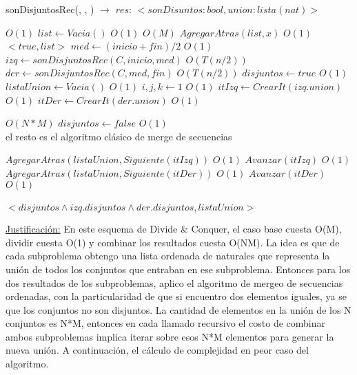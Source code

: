 \documentclass[10pt, a4paper]{article}
\begin{document}
\begin{algorithm}[H]{sonDisjuntosRec(, , ) $\to$ $res$: $<sonDisuntos: bool, union: lista(nat)>$}	
	\begin{algorithmic}[1]
							\Comment $O(1)$
			\State $list \gets Vacia()$			\Comment $O(1)$
			 			\Comment $O(M)$
			 	\State $AgregarAtras(list, x)$	\Comment $O(1)$
			 \EndFor \\
			\Return $<true, list>$
		\Else
			\State $med \gets (inicio + fin)/2$	\Comment $O(1)$
			\State $izq \gets sonDisjuntosRec(C, inicio, med)$	\Comment $O(T(n/2))$
			\State $der \gets sonDisjuntosRec(C, med, fin)$	\Comment $O(T(n/2))$
			\State $disjuntos \gets true$	\Comment $O(1)$
			\State $listaUnion \gets Vacia()$	\Comment $O(1)$
			\State $i, j, k \gets 1$	\Comment $O(1)$
			\State $itIzq \gets CrearIt(izq.union)$	\Comment $O(1)$
			\State $itDer \gets CrearIt(der.union)$	\Comment $O(1)$
			
						\Comment $O(N*M)$
				\State $disjuntos \gets false$	\Comment $O(1)$
				\EndIf \\
				\Comment el resto es el algoritmo clásico de merge de secuencias

					\State $AgregarAtras(listaUnion, Siguiente(itIzq))$	\Comment $O(1)$
					\State $Avanzar(itIzq)$	\Comment $O(1)$
				\Else
					\State $AgregarAtras(listaUnion, Siguiente(itDer))$	\Comment $O(1)$
					\State $Avanzar(itDer)$	\Comment $O(1)$
				\EndIf	 	
			\EndWhile \\
			
		\EndIf	\\
		\Return $<disjuntos \wedge izq.disjuntos \wedge der.disjuntos, listaUnion>$
	
		\medskip
		\Statex \underline{Justificación:} En este esquema de Divide \& Conquer, el caso base cuesta O(M), dividir cuesta O(1) y combinar los resultados cuesta O(NM). La idea es que de cada subproblema obtengo una lista ordenada de naturales que representa la unión de todos los conjuntos que entraban en ese subproblema. Entonces para los dos resultados de los subproblemas, aplico el algoritmo de mergeo de secuencias ordenadas, con la particularidad de que si encuentro dos elementos iguales, ya se que los conjuntos no son disjuntos. La cantidad de elementos en la unión de los N conjuntos es N*M, entonces en cada llamado recursivo el costo de combinar ambos subproblemas implica iterar sobre esos N*M elementos para generar la nueva unión. A continuación, el cálculo de complejidad en peor caso del algoritmo.
    \end{algorithmic}
\end{algorithm}	
\end{document}
